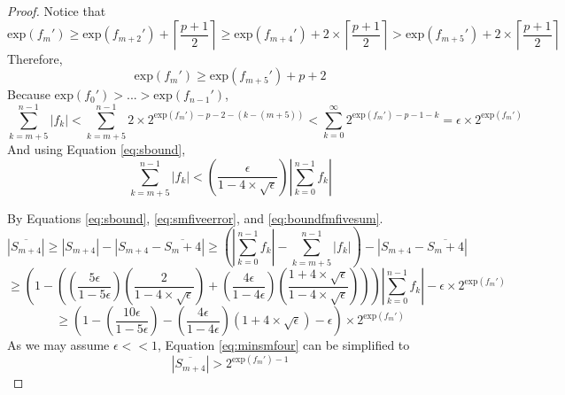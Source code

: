 \documentclass[12pt]{article}
\providecommand{\ceil}[1]{\left \lceil #1 \right \rceil }
\providecommand{\exp}{\ensuremath{\text{exp}}}
\theoremstyle{plain}
\numberwithin{equation}{section}
\begin{document}
\begin{proof}
      Notice that
        \begin{equation*}
          \exp(f_m') \geq \exp(f_{m + 2}') + \ceil{\frac{p+ 1}{2}} \geq \exp(f_{m + 4}') + 2 \times \ceil{\frac{p+ 1}{2}} > \exp(f_{m + 5}')+ 2 \times \ceil{\frac{p+ 1}{2}}
        \end{equation*}
      Therefore,
        \begin{equation}
          \exp(f_m') \geq \exp(f_{m + 5}') + p + 2
          \label{eq:fmfiveexp}
        \end{equation}
      Because $\exp(f_0') > ... > \exp(f_{n - 1}')$,
        \begin{equation}
          \sum\limits_{k = m + 5}^{n - 1} |f_k| < \sum\limits_{k = m + 5}^{n - 1} 2 \times 2^{\exp(f_m') - p - 2 - (k - (m + 5))} < \sum\limits_{k = 0}^{\infty} 2^{\exp(f_m') - p - 1 - k} = \epsilon \times 2^{\exp(f_m')}
          \label{eq:boundfmfivesum}
        \end{equation}
      And using Equation \ref{eq:sbound},
        \begin{equation}
          \sum\limits_{k = m + 5}^{n - 1} |f_k| < (\frac{\epsilon}{1 - 4 \times \sqrt\epsilon})|\sum\limits_{k = 0}^{n - 1} f_k|
          \label{eq:relsboundfmfivesum}
        \end{equation}

      By Equations \ref{eq:sbound}, \ref{eq:smfiveerror}, and \ref{eq:boundfmfivesum}.
        \begin{equation*}
          |\overline{S_{m + 4}}| \geq |S_{m + 4}| - |S_{m + 4} - \overline{S_m + 4}| \geq (|\sum\limits_{k = 0}^{n - 1} f_k| - \sum\limits_{k = m + 5}^{n - 1}|f_k|) - |S_{m + 4} - \overline{S_m + 4}|
        \end{equation*}
        \begin{equation*}
          \geq (1 - ((\frac{5\epsilon}{1 - 5 \epsilon})(\frac{2}{1 - 4 \times \sqrt\epsilon}) + (\frac{4\epsilon}{1 - 4 \epsilon})(\frac{1 + 4 \times \sqrt\epsilon}{1 - 4 \times \sqrt\epsilon})))|\sum\limits_{k = 0}^{n - 1}f_k| - \epsilon \times 2^{\exp(f_m')}
        \end{equation*}
        \begin{equation}
          \geq (1 - (\frac{10\epsilon}{1 - 5 \epsilon}) - (\frac{4\epsilon}{1 - 4 \epsilon})(1 + 4 \times \sqrt\epsilon) - \epsilon)\times 2^{\exp(f_m')}
          \label{eq:minsmfour}
        \end{equation}
        As we may assume $\epsilon << 1$, Equation \ref{eq:minsmfour} can be simplified to
        \begin{equation}
          |\overline{S_{m + 4}}| > 2^{\exp(f_m') - 1}
          \label{eq:minsmfoursimple}
        \end{equation}


\end{proof}
\end{document}
